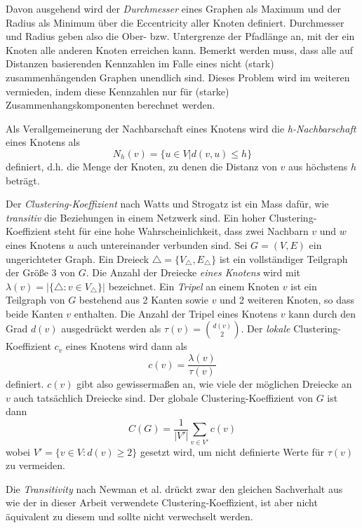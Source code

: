 Davon ausgehend  wird der \emph{Durchmesser} eines Graphen als Maximum
und der Radius als Minimum über die Eccentricity aller Knoten
definiert. Durchmesser und Radius geben also die Ober-
bzw. Untergrenze der Pfadlänge an, mit der ein Knoten alle anderen
Knoten erreichen kann. Bemerkt werden muss, dass alle auf Distanzen
basierenden Kennzahlen im Falle eines nicht (stark)
zusammenhängenden Graphen unendlich sind. Dieses Problem wird im
weiteren vermieden, indem diese Kennzahlen nur für (starke)
Zusammenhangskomponenten berechnet werden.

Als Verallgemeinerung der Nachbarschaft eines Knotens wird die
\emph{h-Nachbarschaft} eines Knotens als
\begin{equation}
  \label{eq:4}
  N_h(v) = \{ u \in V | d(v, u) \le h \}
\end{equation}
definiert, d.h. die Menge der Knoten, zu denen die Distanz von $v$ aus
höchstens $h$ beträgt.

Der \emph{Clustering-Koeffizient} nach Watts und Strogatz ist ein Mass
dafür, wie \emph{transitiv} die Beziehungen in einem Netzwerk
sind. Ein hoher Clustering-Koeffizient steht für eine hohe
Wahrscheinlichkeit, dass zwei Nachbarn $v$ und $w$ eines Knotens $u$
auch untereinander verbunden sind. Sei $G = (V, E)$ ein ungerichteter
Graph. Ein Dreieck $\bigtriangleup = \{V_{\bigtriangleup},
E_{\bigtriangleup}\}$ ist ein vollständiger Teilgraph der Größe 3
von $G$. Die Anzahl der Dreiecke \emph{eines Knotens} wird mit
$\lambda(v) = |\{\bigtriangleup : v \in V_{\bigtriangleup}\}|$
bezeichnet. Ein \emph{Tripel} an einem Knoten $v$ ist ein Teilgraph
von $G$ bestehend aus 2 Kanten sowie $v$ und 2 weiteren Knoten, so
dass beide Kanten $v$ enthalten. Die Anzahl der Tripel eines Knotens
$v$ kann durch den Grad $d(v)$ ausgedrückt werden als
$\tau(v)=\binom{d(v)}{2}$. Der \emph{lokale} Clustering-Koeffizient
$c_v$ eines Knotens wird dann als
\begin{equation}
  \label{eq:5}
  c(v) = \frac{\lambda(v)}{\tau(v)}
\end{equation}
definiert. $c(v)$ gibt also gewissermaßen an, wie viele der
möglichen Dreiecke an $v$ auch tatsächlich Dreiecke sind. Der
globale Clustering-Koeffizient von $G$ ist dann
\begin{equation}
  \label{eq:6}
  C(G) = \frac{1}{|V'|} \sum_{v \in V'}c(v)
\end{equation}
wobei $V' = \{v \in V : d(v) \ge 2\}$ gesetzt wird, um nicht
definierte Werte für $\tau(v)$ zu vermeiden.

Die \emph{Transitivity} nach Newman et al. drückt zwar den gleichen
Sachverhalt aus wie der in dieser Arbeit verwendete
Clustering-Koeffizient, ist aber nicht äquivalent zu diesem und
sollte nicht verwechselt werden.

